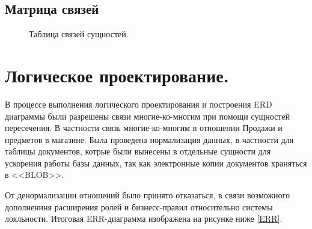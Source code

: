\documentclass[14pt]{extreport}
\begin{document}
    \begin{landscape}
        
    
    \section{Матрица связей}
    
    \begin{figure}[H]%
        \centering
        \caption{Таблица связей сущностей.}
        \label{pic1} 
       \end{figure}
    \end{landscape}

\chapter{Логическое проектирование.}
    В процессе выполнения логического проектирования и построения ERD диаграммы были разрешены связи многие-ко-многим при помощи %
    сущностей пересечения. В частности связь многие-ко-многим в отношении Продажи и предметов в магазине. Была проведена нормализация данных, в частности для%
    таблицы документов, котрые были вынесены в отдельные сущности для ускорения работы базы данных, так как электронные копии документов храняться в <<BLOB>>.

    От денормализации отношений было принято отказаться, в связи возможного дополнениня расширения ролей и бизнесс-правил относительно системы лояльности. 
    Итоговая ERR-диаграмма изображена на рисунке ниже \ref{ERR}.

    
    
\end{document}

